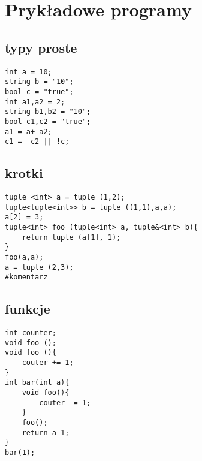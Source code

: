 \documentclass{article}
\begin{document}
\section{Prykładowe programy}
\subsection{typy proste}
\begin{verbatim}
int a = 10; 
string b = "10";
bool c = "true";
int a1,a2 = 2;
string b1,b2 = "10";
bool c1,c2 = "true";
a1 = a+-a2;
c1 =  c2 || !c;
\end{verbatim}
\subsection{krotki}
\begin{verbatim}
tuple <int> a = tuple (1,2);
tuple<tuple<int>> b = tuple ((1,1),a,a);
a[2] = 3;
tuple<int> foo (tuple<int> a, tuple&<int> b){
    return tuple (a[1], 1);
}
foo(a,a);
a = tuple (2,3);
#komentarz
\end{verbatim}

\subsection{funkcje}
\begin{verbatim}
int counter;
void foo ();
void foo (){
    couter += 1;
}
int bar(int a){
    void foo(){
        couter -= 1;
    }
    foo();
    return a-1;
}
bar(1);
\end{verbatim}
\end{document}
